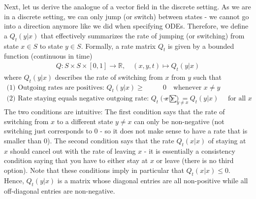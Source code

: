 Next, let us derive the analogue of a vector field in the discrete setting. As we are in a discrete setting, we can only jump (or switch) between states - we cannot go into a direction anymore like we did when specifying ODEs. Therefore, we define a  $Q_t(y|x)$ that effectively summarizes the rate of jumping (or switching) from state $x\in S$ to state $y\in S$. Formally, a rate matrix $Q_t$ is given by a bounded function (continuous in time) 
\begin{align}
\label{eq:rate_matrix}
    Q:S\times S\times[0,1] \to \mathbb{R},\quad 
    (x,y,t)\mapsto Q_t(y|x)
\end{align}
where $Q_t(y|x)$ describes the rate of switching from $x$ from $y$ such that 
\begin{align}
\label{eq:condition_1_ctmc}
    \text{(1) Outgoing rates are positives:  }Q_t(y|x)\geq& 0 \quad \text{whenever }x\neq y\\
\label{eq:condition_2_ctmc}
    \text{(2) Rate staying equals negative outgoing rate: }Q_t(x|x)=&-\sum\limits_{y\neq x}Q_t(y|x)\quad \text{ for all }x
\end{align}
The two conditions are intuitive: The first condition says that the rate of switching from $x$ to a different state $y\neq x$ can only be non-negative (not switching just corresponds to $0$ - so it does not make sense to have a rate that is smaller than $0$). The second condition says that the rate $Q_t(x|x)$ of staying at $x$ should cancel out with the rate of leaving $x$ - it is essentially a consistency condition saying that you have to either stay at $x$ or leave (there is no third option). Note that these conditions imply in particular that $Q_t(x|x)\leq 0$. Hence, $Q_t(y|x)$ is a matrix whose diagonal entries are all non-positive while all off-diagonal entries are non-negative.

